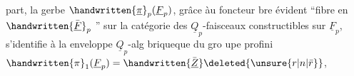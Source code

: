 
part,  la gerbe $\handwritten{\underline{\pi}}_p(\underline{F}_p)$, grâce àu foncteur bre évident ``fibre en $\handwritten{\bar{\underline{F}}}_p$ '' sur la catégorie des $\underline{Q}_p$-faisceaux constructibles sur $\underline{F}_p$, s'identifie à la enveloppe $\underline{Q}_p$-alg briqueque du gro upe profini $\handwritten{\pi}_1(\underline{F}_p)=\handwritten{\bar{\underline{Z}}}\deleted{\unsure{r|n|\bar r}}$, 

